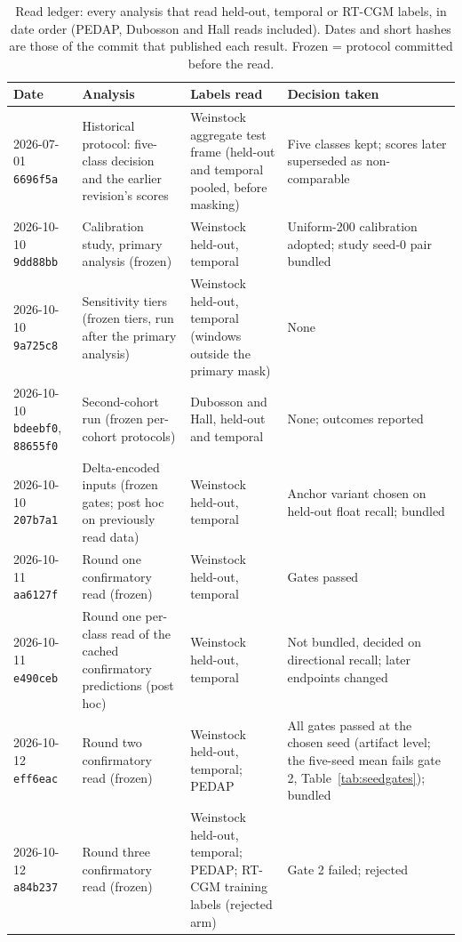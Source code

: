 \documentclass[10pt,twocolumn]{article}
\begin{document}
\begin{table}[!tp]
\centering
\caption{Read ledger: every analysis that read held-out, temporal or
RT-CGM labels, in date order (PEDAP, Dubosson and Hall reads included).
Dates and short hashes are those of the commit that published each
result. Frozen = protocol committed before the read.}
\label{tab:readledger}
\raggedcells
\footnotesize
\setlength{\tabcolsep}{4pt}
\begin{tabular}{@{}p{1.65cm}p{5.75cm}p{4.15cm}p{5.4cm}@{}}
\toprule
Date & Analysis & Labels read & Decision taken \\
\midrule
2026-07-01 \texttt{6696f5a} & Historical protocol: five-class decision and the earlier revision's scores & Weinstock aggregate test frame (held-out and temporal pooled, before masking) & Five classes kept; scores later superseded as non-comparable \\
2026-10-10 \texttt{9dd88bb} & Calibration study, primary analysis (frozen) & Weinstock held-out, temporal & Uniform-200 calibration adopted; study seed-0 pair bundled \\
2026-10-10 \texttt{9a725c8} & Sensitivity tiers (frozen tiers, run after the primary analysis) & Weinstock held-out, temporal (windows outside the primary mask) & None \\
2026-10-10 \texttt{bdeebf0}, \texttt{88655f0} & Second-cohort run (frozen per-cohort protocols) & Dubosson and Hall, held-out and temporal & None; outcomes reported \\
2026-10-10 \texttt{207b7a1} & Delta-encoded inputs (frozen gates; post hoc on previously read data) & Weinstock held-out, temporal & Anchor variant chosen on held-out float recall; bundled \\
2026-10-11 \texttt{aa6127f} & Round one confirmatory read (frozen) & Weinstock held-out, temporal & Gates passed \\
2026-10-11 \texttt{e490ceb} & Round one per-class read of the cached confirmatory predictions (post hoc) & Weinstock held-out, temporal & Not bundled, decided on directional recall; later endpoints changed \\
2026-10-12 \texttt{eff6eac} & Round two confirmatory read (frozen) & Weinstock held-out, temporal; PEDAP & All gates passed at the chosen seed (artifact level; the five-seed mean fails gate 2, Table~\ref{tab:seedgates}); bundled \\
2026-10-12 \texttt{a84b237} & Round three confirmatory read (frozen) & Weinstock held-out, temporal; PEDAP; RT-CGM training labels (rejected arm) & Gate 2 failed; rejected \\

\end{tabular}
\end{table}
\end{document}
